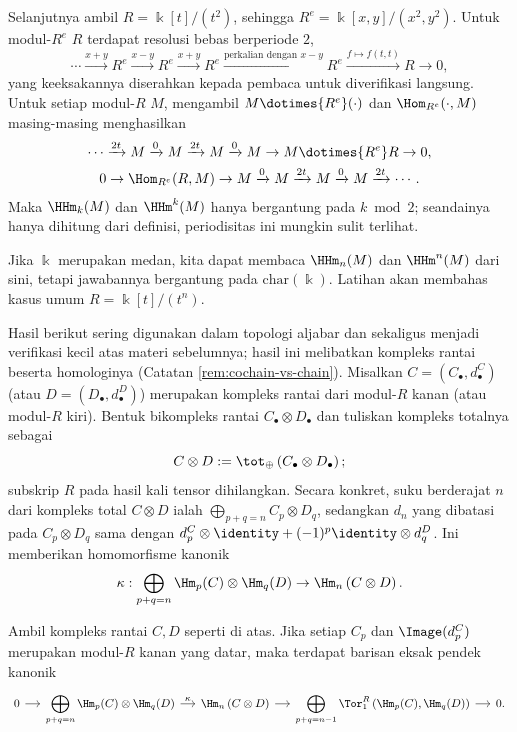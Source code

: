 Selanjutnya ambil $R=\Bbbk[t]/(t^2)$, sehingga
$R^e=\Bbbk[x,y]/(x^2,y^2)$. Untuk modul-$R^e$ $R$ terdapat resolusi bebas
berperiode $2$,
\[
\cdots\xrightarrow{x+y}R^e\xrightarrow{x-y}R^e\xrightarrow{x+y}R^e
\xrightarrow{\text{perkalian dengan }x-y}R^e\xrightarrow{f\mapsto f(t,t)}R\to0,
\]
yang keeksakannya diserahkan kepada pembaca untuk diverifikasi langsung.
Untuk setiap modul-$R$ $M$, mengambil $M\dotimes{R^e}(\cdot)$ dan
$\Hom_{R^e}(\cdot,M)$ masing-masing menghasilkan
\begin{gather*}
\cdots\xrightarrow{2t}M\xrightarrow{0}M\xrightarrow{2t}M\xrightarrow{0}M
\to M\dotimes{R^e}R\to0,\\
0\to\Hom_{R^e}(R,M)\to M\xrightarrow{0}M\xrightarrow{2t}M
\xrightarrow{0}M\xrightarrow{2t}\cdots.
\end{gather*}
Maka $\HHm_k(M)$ dan $\HHm^k(M)$ hanya bergantung pada $k\bmod2$;
seandainya hanya dihitung dari definisi, periodisitas ini mungkin sulit
terlihat.

Jika $\Bbbk$ merupakan medan, kita dapat membaca $\HHm_n(M)$ dan
$\HHm^n(M)$ dari sini, tetapi jawabannya bergantung pada
$\mathrm{char}(\Bbbk)$. Latihan akan membahas kasus umum
$R=\Bbbk[t]/(t^n)$.

Hasil berikut sering digunakan dalam topologi aljabar dan sekaligus menjadi
verifikasi kecil atas materi sebelumnya; hasil ini melibatkan kompleks rantai
beserta homologinya (Catatan \ref{rem:cochain-vs-chain}). Misalkan
$C=(C_\bullet,d^C_\bullet)$ (atau $D=(D_\bullet,d^D_\bullet)$) merupakan
kompleks rantai dari modul-$R$ kanan (atau modul-$R$ kiri). Bentuk
bikompleks rantai $C_\bullet\otimes D_\bullet$ dan tuliskan kompleks totalnya
sebagai
\[
C\otimes D:=\tot_{\oplus}\left(C_\bullet\otimes D_\bullet\right);
\]
subskrip $R$ pada hasil kali tensor dihilangkan. Secara konkret, suku
berderajat $n$ dari kompleks total $C\otimes D$ ialah
$\bigoplus_{p+q=n}C_p\otimes D_q$, sedangkan $d_n$ yang dibatasi pada
$C_p\otimes D_q$ sama dengan $d^C_p\otimes\identity+(-1)^p\identity\otimes
	d^D_q$. Ini memberikan homomorfisme kanonik
\[
\kappa:\bigoplus_{p+q=n}\Hm_p(C)\otimes\Hm_q(D)\to
\Hm_n\left(C\otimes D\right).
\]

\begin{teorema}\label{prop:Kunneth-homology}
Ambil kompleks rantai $C,D$ seperti di atas. Jika setiap $C_p$ dan
$\Image(d^C_p)$ merupakan modul-$R$ kanan yang datar, maka terdapat barisan
eksak pendek kanonik
\[
\begin{tikzcd}[column sep=small, every cell/.append style={font = \small}]
0 \arrow[r] & \displaystyle\bigoplus_{p+q=n} \Hm_p(C) \otimes \Hm_q(D)
\arrow[r, "\kappa"] & \Hm_n\left(C \otimes D \right) \arrow[r] &
\displaystyle\bigoplus_{p+q=n-1} \Tor_1^R\left( \Hm_p(C), \Hm_q(D) \right)
\arrow[r] & 0.
\end{tikzcd}
\]
\end{teorema}

